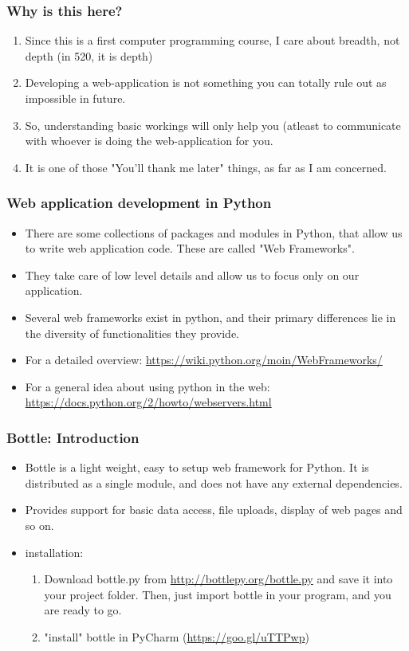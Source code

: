 \documentclass{beamer}
\begin{document}
\begin{frame}
\frametitle{Why is this here?}
\begin{enumerate}
\item Since this is a first computer programming course, I care about breadth, not depth (in 520, it is depth)
\item Developing a web-application is not something you can totally rule out as impossible in future.
\item So, understanding basic workings will only help you (atleast to communicate with whoever is doing the web-application for you. \pause
\item It is one of those "You'll thank me later" things, as far as I am concerned. 
\end{enumerate}
\end{frame}

\begin{frame}
\frametitle{Web application development in Python}
\begin{itemize}
\item There are some collections of packages and modules in Python, that allow us to write web application code. These are called "Web Frameworks".
\item They take care of low level details and allow us to focus only on our application. 
\item Several web frameworks exist in python, and their primary differences lie in the diversity of functionalities they provide. 
\item For a detailed overview: \url{https://wiki.python.org/moin/WebFrameworks/}
\item For a general idea about using python in the web: \url{https://docs.python.org/2/howto/webservers.html}
\end{itemize}
\end{frame}

\begin{frame}
\frametitle{Bottle: Introduction}
\begin{itemize}
\item Bottle is a light weight, easy to setup web framework for Python. It is distributed as a single module, and does not have any external dependencies.
\item Provides support for basic data access, file uploads, display of web pages and so on.
\item installation: 
\begin{enumerate}
\item Download bottle.py from \url{http://bottlepy.org/bottle.py} and save it into your project folder. Then, just import bottle in your program, and you are ready to go.
\item "install" bottle in PyCharm (\url{https://goo.gl/uTTPwp})
\end{enumerate}
\end{itemize}
\end{frame}
\end{document}
